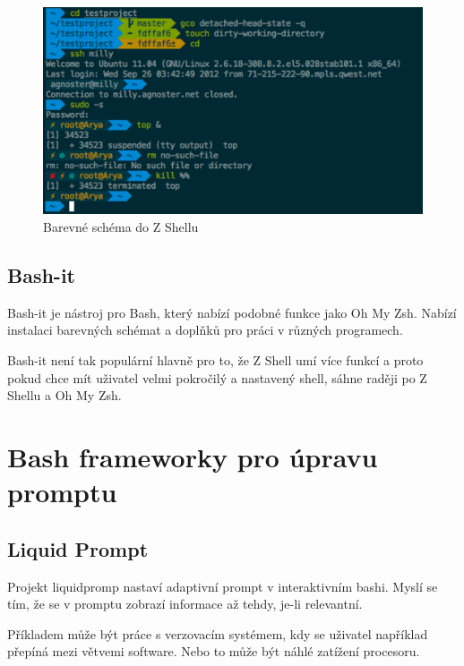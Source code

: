 \documentclass[thesis=M,czech]{FITthesis}[2012/06/26]
\begin{document}
\begin{figure}[htb]\centering
	\includegraphics[width=\textwidth]{./images/zsh_theme}
	\caption{Barevné schéma do Z Shellu}
	\label{fig:zsh_theme}
\end{figure}


%
%
%
\subsection{Bash-it}

Bash-it je nástroj pro Bash, který nabízí podobné funkce jako Oh My Zsh. Nabízí instalaci barevných schémat a doplňků pro práci v různých programech.

Bash-it není tak populární hlavně pro to, že Z Shell umí více funkcí a proto pokud chce mít uživatel velmi pokročilý a nastavený shell, sáhne raději po Z Shellu a Oh My Zsh.


%

%
%
%
\section{Bash frameworky pro úpravu promptu}

\subsection{Liquid Prompt}

Projekt liquidpromp nastaví adaptivní prompt v interaktivním bashi. Myslí se tím, že se v promptu zobrazí informace až tehdy, je-li relevantní.

Příkladem může být práce s verzovacím systémem, kdy se uživatel například přepíná mezi větvemi software. Nebo to může být náhlé zatížení procesoru.
\end{document}
